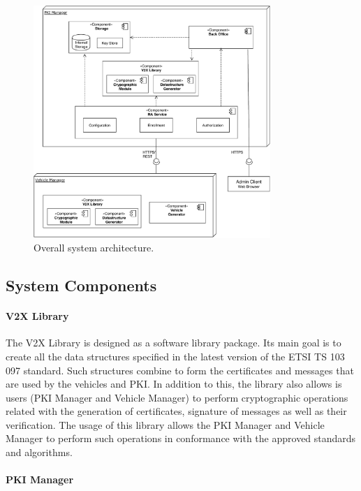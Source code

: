 \begin{figure}[h]
	\centering
	\includegraphics[width=0.8\textwidth]{Figures/arquitetura}
	\caption{\label{fig:system_arch}Overall system architecture.}
\end{figure}

\subsection{System Components}

\paragraph{V2X Library}
\label{section:model}

The V2X Library is designed as a software library package. Its main goal is to create all the data structures specified in the latest version of the ETSI TS 103 097 standard. Such structures combine to form the certificates and messages that are used by the vehicles and PKI. In addition to this, the library also allows is users (PKI Manager and Vehicle Manager) to perform cryptographic operations related with the generation of certificates, signature of messages as well as their verification. The usage of this library allows the PKI Manager and Vehicle Manager to perform such operations in conformance with the approved standards and algorithms.

\paragraph{PKI Manager}
\label{section:model}

